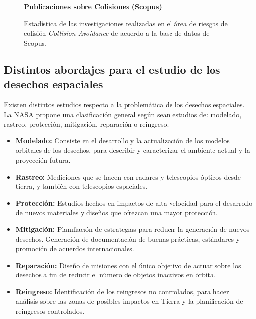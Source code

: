 \begin{figure}[!h]
\centering
   \textbf{Publicaciones sobre Colisiones (Scopus)}\par\medskip
    \caption[Riesgos de Colisi\'on seg\'un Scopus]{Estad\'istica de las investigaciones realizadas en el \'area de riesgos de colisi\'on {\it{Collision Avoidance}} de acuerdo a la base de datos de Scopus.}
    \label{fig:scopusCA}
\end{figure} 

\subsection*{Distintos abordajes para el estudio de los desechos espaciales}
Existen distintos estudios respecto a la problem\'atica de los desechos espaciales. La \ac{NASA} propone una clasificaci\'on general seg\'un sean estudios de: modelado, rastreo, protecci\'on, mitigaci\'on, reparaci\'on o reingreso.\\
\begin{itemize}
\item {\bf{Modelado:}} Consiste en el desarrollo y la actualizaci\'on de los modelos orbitales de los desechos, para describir y caracterizar el ambiente actual y la proyecci\'on futura.\\
\item {\bf{Rastreo:}} Mediciones que se hacen con radares y telescopios \'opticos desde tierra, y tambi\'en con telescopios espaciales.\\
\item {\bf{Protecci\'on:}} Estudios hechos en impactos de alta velocidad para el desarrollo de nuevos materiales y dise\~nos que ofrezcan una mayor protecci\'on.\\
\item {\bf{Mitigaci\'on:}} Planifiaci\'on de estrategias para reducir la generaci\'on de nuevos desechos. Generaci\'on de documentaci\'on  de buenas pr\'acticas, est\'andares y promoci\'on de acuerdos internacionales.\\
\item {\bf{Reparaci\'on:}} Dise\~no de misiones con el \'unico objetivo de actuar sobre los desechos a fin de reducir el n\'umero de objetos inactivos en \'orbita.\\
\item {\bf{Reingreso:}} Identificaci\'on de los reingresos no controlados, para hacer an\'alisis sobre las zonas de posibles impactos en Tierra y la planificaci\'on de reingresos controlados.\\
\end{itemize}


